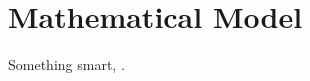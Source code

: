 \section{Mathematical Model}
Something smart, \cite{Brennen2005fundamentalsmultiphaseflows}.

\Blindtext

